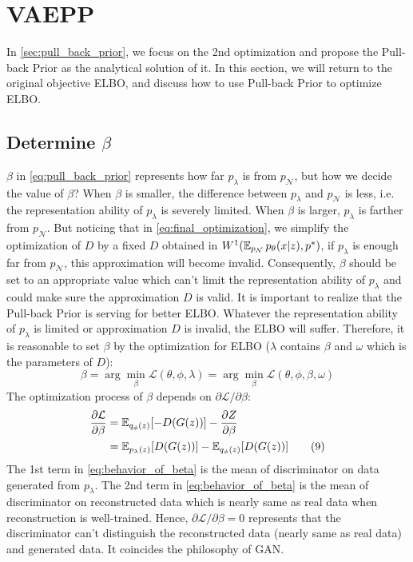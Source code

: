 \section{VAEPP}\label{sec:vaepp}


In \cref{sec:pull_back_prior}, we focus on the 2nd optimization and propose the Pull-back Prior as the analytical solution of it. In this section, we will return to the original objective ELBO, and discuss how to use Pull-back Prior to optimize ELBO.

\subsection{Determine $\beta$}

$\beta$ in \cref{eq:pull_back_prior} represents how far $p_\lambda$ is from $p_\mathcal{N}$, but how we decide the value of $\beta$? When $\beta$ is smaller, the difference between $p_\lambda$ and $p_\mathcal{N}$ is less, i.e. the representation ability of $p_\lambda$ is severely limited. When $\beta$ is larger, $p_\lambda$ is farther from $p_\mathcal{N}$. But noticing that in \cref{eq:final_optimization}, we simplify the optimization of $D$ by a fixed $D$ obtained in $W^1(\operatorname{\mathbb{E}}_{p_\mathcal{N}}p_\theta(x|z), p^*)$, if $p_\lambda$ is enough far from $p_\mathcal{N}$, this approximation will become invalid. Consequently, $\beta$ should be set to an appropriate value which can't limit the representation ability of $p_\lambda$ and could make sure the approximation $D$ is valid. It is important to realize that the Pull-back Prior is serving for better ELBO. Whatever the representation ability of $p_\lambda$ is limited or approximation $D$ is invalid, the ELBO will suffer. Therefore, it is reasonable to set $\beta$ by the optimization for ELBO ($\lambda$ contains $\beta$ and $\omega$ which is the parameters of $D$):
\begin{equation}
	\beta = \arg \min_{\beta} \mathcal{L}(\theta, \phi, \lambda) = \arg \min_{\beta} \mathcal{L}(\theta, \phi, \beta, \omega) \tag{8}
\end{equation}
The optimization process of $\beta$ depends on $\partial \mathcal{L}/\partial \beta$:
\begin{align*}\label{eq:behavior_of_beta}
\frac{\partial \mathcal{L}}{\partial \beta} &= \operatorname{\mathbb{E}}_{q_\phi(z)}[ -D(G(z))] - \frac{\partial Z}{\partial \beta} \\
&= \operatorname{\mathbb{E}}_{p_\lambda(z)}[ D(G(z))] - \operatorname{\mathbb{E}}_{q_\phi(z)}[ D(G(z))]  \tag{9}
\end{align*}
The 1st term in \cref{eq:behavior_of_beta} is the mean of discriminator on data generated from $p_\lambda$. The 2nd term in \cref{eq:behavior_of_beta} is the mean of discriminator on reconstructed data which is nearly same as real data when reconstruction is well-trained. Hence, $\partial \mathcal{L}/\partial \beta = 0$ represents that the discriminator can't distinguish the reconstructed data (nearly same as real data) and generated data. It coincides the philosophy of GAN. 

